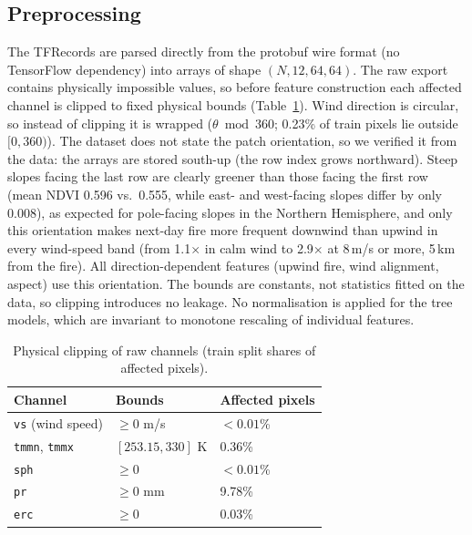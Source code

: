 \subsection{Preprocessing}
The TFRecords are parsed directly from the protobuf wire format (no TensorFlow dependency) into
arrays of shape $(N,12,64,64)$. The raw export contains physically impossible values,
so before feature construction each affected channel is clipped to fixed physical bounds
(Table~\ref{tab:clip}). Wind direction is circular, so instead of clipping it is wrapped
($\theta \bmod 360$; 0.23\% of train pixels lie outside $[0, 360)$).
The dataset does not state the patch orientation, so we verified it from the data: the arrays are
stored south-up (the row index grows northward). Steep slopes facing the last row are clearly
greener than those facing the first row (mean NDVI 0.596 vs.\ 0.555, while east- and west-facing
slopes differ by only 0.008), as expected for pole-facing slopes in the Northern Hemisphere, and only
this orientation makes next-day fire more frequent downwind than upwind in every wind-speed band
(from 1.1$\times$ in calm wind to 2.9$\times$ at 8\,m/s or more, 5\,km from the fire). All
direction-dependent features (upwind fire, wind alignment, aspect) use this orientation. The bounds are constants, not statistics fitted on the data, so clipping
introduces no leakage. No normalisation is applied for the tree models, which are invariant to
monotone rescaling of individual features.

\begin{table}[t]
\centering
\caption{Physical clipping of raw channels (train split shares of affected pixels).}
\label{tab:clip}
\begin{tabular}{lll}
\hline
Channel & Bounds & Affected pixels \\
\hline
\texttt{vs} (wind speed) & $\geq 0$ m/s & $<0.01$\% \\
\texttt{tmmn}, \texttt{tmmx} & $[253.15, 330]$ K & 0.36\% \\
\texttt{sph} & $\geq 0$ & $<0.01$\% \\
\texttt{pr} & $\geq 0$ mm & 9.78\% \\
\texttt{erc} & $\geq 0$ & 0.03\% \\
\hline
\end{tabular}
\end{table}

